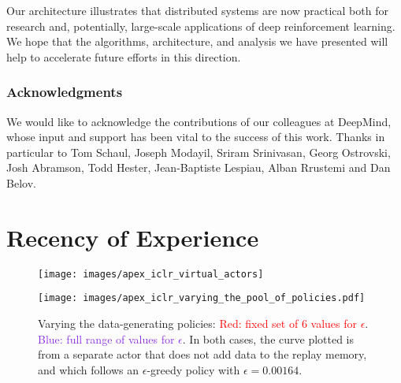 \documentclass{article} \PassOptionsToPackage{usenames,dvipsnames}{xcolor}
\def\smallcaption#1{\caption{\small #1}\vspace{-0.4cm}}
\begin{document}
Our architecture illustrates that distributed systems are now practical both for research and, potentially, large-scale applications of deep reinforcement learning. 
We hope that the algorithms, architecture, and analysis we have presented will help to accelerate future efforts in this direction.

\newpage

\subsubsection*{Acknowledgments}

We would like to acknowledge the contributions of our colleagues at DeepMind, whose input and support has been vital to the success of this work. Thanks in particular to Tom Schaul, Joseph Modayil, Sriram Srinivasan, Georg Ostrovski, Josh Abramson, Todd Hester, Jean-Baptiste Lespiau, Alban Rrustemi and Dan Belov.




\newpage

\appendix

\section{Recency of Experience}

\begin{figure}
\begin{minipage}[t]{0.48\textwidth}
\centering
\texttt{[image: images/apex\_iclr\_virtual\_actors]}
\smallcaption{Testing whether improved performance is caused by recency alone: $n$ denotes the number of actors, $k$ the number of times each transition is replicated in the replay. The data in the run with $n=32$, $k=8$ is therefore as recent as the data in the run with $n=256$, $k=1$, but performance is not as good.}
\label{fig:control_virtual_actors}
\end{minipage}
\hspace{0.03\textwidth}
\begin{minipage}[t]{0.48\textwidth}
\texttt{[image: images/apex\_iclr\_varying\_the\_pool\_of\_policies.pdf]}
\smallcaption{Varying the data-generating policies: \textcolor{Red}{Red: fixed set of 6 values for $\epsilon$}. \textcolor{BlueViolet}{Blue: full range of values for $\epsilon$}. In both cases, the curve plotted is from a separate actor that does not add data to the replay memory, and which follows an $\epsilon$-greedy policy with $\epsilon=0.00164$.}
\label{fig:vary_policy_pool}
\end{minipage}
\end{figure}
\end{document}
